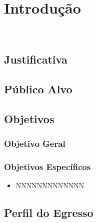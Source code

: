 \documentclass[11pt,fleqn]{book} %
\begin{document}
\chapter{Introdução}\label{introducao}
\vspace{6em}
\begin{flushright}
	\textit{\textcolor{white}{Um bonita citação...}}
\end{flushright}
\vspace{12em}


\section{Justificativa}


\section{Público Alvo}


\section{Objetivos}\label{objetivos}

\subsection{Objetivo Geral}


\subsection{Objetivos Específicos}

\begin{itemize}
\item NNNNNNNNNNNNN 
\end{itemize}


\section{Perfil do Egresso}
\end{document}
